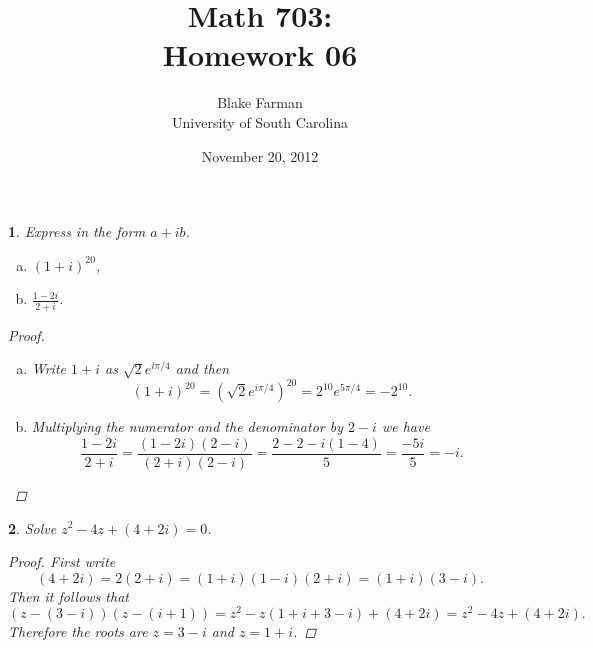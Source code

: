 \documentclass[12pt]{amsart}
\author{Blake Farman\\University of South Carolina}
\title{Math 703:\\Homework 06}
\date{November 20, 2012}
\begin{document}
\maketitle

\newtheorem{thm}{}
\setcounter{thm}{20}
\newtheorem{ex}{}[thm]
\newtheorem{lem}{Lemma}
\theoremstyle{definition}
\newtheorem{defn}{Definition}

\begin{thm}
  Express in the form $a + ib$.
  
  \begin{enumerate}[(a)]
  \item
    $(1 + i)^{20}$,
  \item
    $\frac{1 - 2i}{2 + i}$.
  \end{enumerate}
  
  \begin{proof}
    \begin{enumerate}[(a)]
      \item
        Write $1 + i$ as $\sqrt{2}e^{i\pi/4}$ and then 
        $$(1 + i)^{20} = (\sqrt{2}e^{i\pi/4})^{20} = 2^{10}e^{5\pi/4} = -2^{10}.$$
      \item
        Multiplying the numerator and the denominator by $2 - i$ we have
        $$\frac{1 - 2i}{2 + i} = \frac{(1 - 2i)(2 - i)}{(2 + i)(2 - i)} = \frac{2 - 2 - i(1 - 4)}{5} = \frac{-5i}{5} = -i.$$
    \end{enumerate}
  \end{proof}
\end{thm}

\begin{thm}
  Solve $z^2 - 4z + (4 + 2i) = 0$.
  \begin{proof}
    First write
    $$(4 + 2i) = 2(2 + i) = (1 + i)(1 - i)(2 + i) = (1 + i)(3 - i).$$
    Then it follows that 
    $$(z - (3 - i))(z - (i + 1)) = z^2 - z(1 + i + 3 - i) + (4 + 2i) = z^2 - 4z + (4 + 2i).$$
    Therefore the roots are $z = 3 - i$ and $z = 1 + i$.
  \end{proof}
\end{thm}
\end{document}
